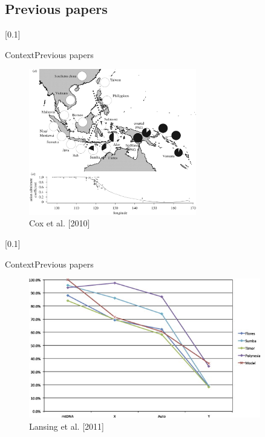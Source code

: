 \documentclass[10pt,aspectratio=43]{beamer}
\begin{document}
\subsection{Previous papers}
[0.1]{}{}{}
\begin{frame}{Context}{Previous papers}
\begin{center}
  \begin{figure}
    \includegraphics[width=0.65\textwidth]{../data/cox-image.jpg}
    \caption{Cox et al. [2010]}
  \end{figure}
\end{center}
\end{frame}
[0.1]{}{}{}
\begin{frame}{Context}{Previous papers}
\begin{center}
  \begin{figure}
    \includegraphics[width=0.9\textwidth]{../data/lansing-image.jpg}
    \caption{Lansing et al. [2011]}
  \end{figure}
\end{center}
\end{frame}
\end{document}
